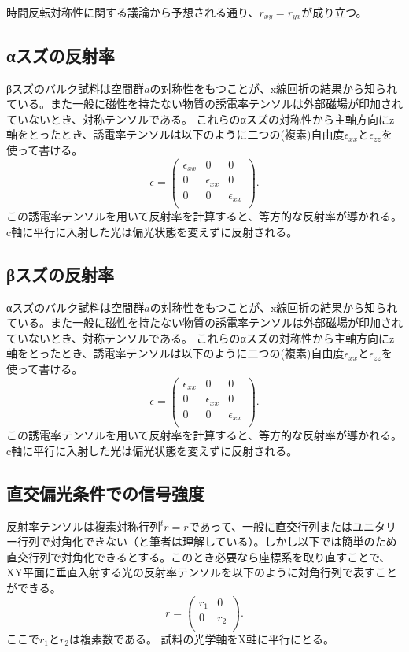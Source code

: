 時間反転対称性に関する議論から予想される通り、$r_{xy}=r_{yx}$が成り立つ。

\subsection{αスズの反射率}
\label{sec:reflectance_alpha}
βスズのバルク試料は空間群$a$の対称性をもつことが、x線回折の結果から知られている\cite{space_group_IrTe2}。また一般に磁性を持たない物質の誘電率テンソルは外部磁場が印加されていないとき、対称テンソルである\cite{landau}。
これらのαスズの対称性から主軸方向にz軸をとったとき、誘電率テンソルは以下のように二つの(複素)自由度$\epsilon_{xx}$と$\epsilon_{zz}$を使って書ける。
\[
  \epsilon = \left(
    \begin{array}{ccc}
      \epsilon_{xx} & 0 & 0 \\
      0 & \epsilon_{xx} & 0\\
      0 & 0 & \epsilon_{xx} \\
    \end{array}
  \right).
\]
この誘電率テンソルを用いて反射率を計算すると、等方的な反射率が導かれる。c軸に平行に入射した光は偏光状態を変えずに反射される。

\subsection{βスズの反射率}
\label{sec:reflectance_beta}
αスズのバルク試料は空間群$a$の対称性をもつことが、x線回折の結果から知られている\cite{space_group_IrTe2}。また一般に磁性を持たない物質の誘電率テンソルは外部磁場が印加されていないとき、対称テンソルである\cite{landau}。
これらのαスズの対称性から主軸方向にz軸をとったとき、誘電率テンソルは以下のように二つの(複素)自由度$\epsilon_{xx}$と$\epsilon_{zz}$を使って書ける。
\[
  \epsilon = \left(
    \begin{array}{ccc}
      \epsilon_{xx} & 0 & 0 \\
      0 & \epsilon_{xx} & 0\\
      0 & 0 & \epsilon_{xx} \\
    \end{array}
  \right).
\]
この誘電率テンソルを用いて反射率を計算すると、等方的な反射率が導かれる。c軸に平行に入射した光は偏光状態を変えずに反射される。


\subsection{直交偏光条件での信号強度}
\label{sec:diagonazed_reflectance}
反射率テンソルは複素対称行列${}^t r=r$であって、一般に直交行列またはユニタリー行列で対角化できない（と筆者は理解している）。しかし以下では簡単のため直交行列で対角化できるとする。このとき必要なら座標系を取り直すことで、XY平面に垂直入射する光の反射率テンソルを以下のように対角行列で表すことができる。
\[
  r = \left(
    \begin{array}{cc}
      r_1 &0  \\
      0 & r_2  \\
    \end{array} 
  \right) .
\]
ここで$r_1$と$r_2$は複素数である。 試料の光学軸をX軸に平行にとる。

